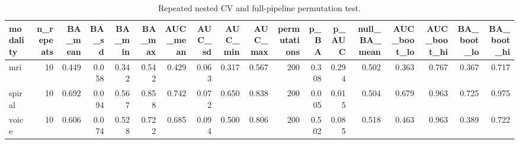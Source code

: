 \begin{table}
\caption{Repeated nested CV and full-pipeline permutation test.}
\label{tab:table3_repeated_cv_permutation}
\begin{tabular}{lrrrrrrrrrrrrrrrrr}
\toprule
modality & n_repeats & BA_mean & BA_sd & BA_min & BA_max & AUC_mean & AUC_sd & AUC_min & AUC_max & permutations & p_BA & p_AUC & null_BA_mean & AUC_boot_lo & AUC_boot_hi & BA_boot_lo & BA_boot_hi \\
\midrule
mri & 10 & 0.449 & 0.058 & 0.342 & 0.542 & 0.429 & 0.063 & 0.317 & 0.567 & 200 & 0.308 & 0.294 & 0.502 & 0.363 & 0.767 & 0.367 & 0.717 \\
spiral & 10 & 0.692 & 0.094 & 0.567 & 0.858 & 0.742 & 0.072 & 0.650 & 0.838 & 200 & 0.005 & 0.015 & 0.504 & 0.679 & 0.963 & 0.725 & 0.975 \\
voice & 10 & 0.606 & 0.074 & 0.528 & 0.722 & 0.685 & 0.094 & 0.500 & 0.806 & 200 & 0.502 & 0.085 & 0.518 & 0.463 & 0.963 & 0.389 & 0.722 \\
\bottomrule
\end{tabular}
\end{table}
